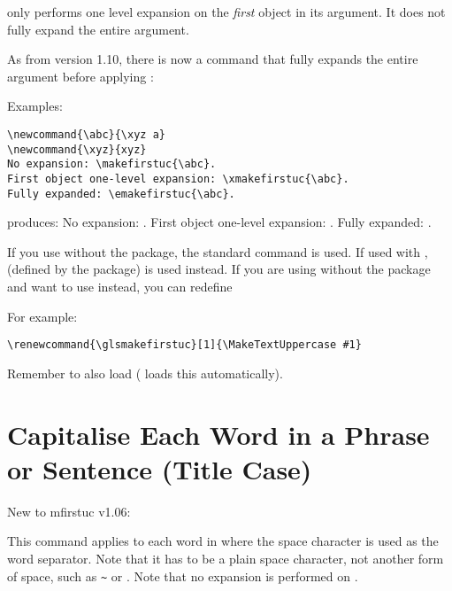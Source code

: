 \documentclass{nlctdoc}
\begin{document}
\begin{important}
 only performs one level expansion on the
\emph{first} object in its argument. It does not fully expand the entire
argument.
\end{important}

As from version 1.10, there is now a command that fully expands the
entire argument before applying :
\begin{definition}[\DescribeMacro\emakefirstuc]
\end{definition}

Examples:
\begin{verbatim}
\newcommand{\abc}{\xyz a}
\newcommand{\xyz}{xyz}
No expansion: \makefirstuc{\abc}.
First object one-level expansion: \xmakefirstuc{\abc}.
Fully expanded: \emakefirstuc{\abc}.
\end{verbatim}
produces: 
\renewcommand{\abc}{\xyz a}%
\newcommand{\xyz}{xyz}
No expansion: \makefirstuc{\abc}.
First object one-level expansion: \xmakefirstuc{\abc}.
Fully expanded: \emakefirstuc{\abc}.

If you use  without the  package, 
the standard  command is used. If used with
,  (defined by the 
package) is used instead. If you are using 
without the  package and want to use
 instead, you can redefine
\begin{definition}[\DescribeMacro\glsmakefirstuc]
\end{definition}
For example:
\begin{verbatim}
\renewcommand{\glsmakefirstuc}[1]{\MakeTextUppercase #1}
\end{verbatim}
Remember to also load  ( loads this
automatically).

\section{Capitalise Each Word in a Phrase or Sentence (Title Case)}
\label{sec:capitalisewords}

New to mfirstuc v1.06:
\begin{definition}[\DescribeMacro{\capitalisewords}]
\end{definition}
This command applies  to each word in 
where the space character is used as the word separator. Note that
it has to be a plain space character, not another form of space,
such as \verb|~| or . Note that no expansion is performed
on .
\end{document}
